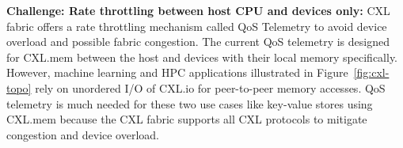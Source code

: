%
%
\noindent \textbf{Challenge: Rate throttling between host CPU and devices only:}
CXL fabric offers a rate throttling mechanism called QoS Telemetry to avoid device overload and possible fabric congestion. 
%
The current QoS telemetry is designed for CXL.mem between the host and devices with their local memory specifically.
%
However, machine learning and HPC applications illustrated in Figure~\ref{fig:cxl-topo} rely on unordered I/O of CXL.io for peer-to-peer memory accesses.
%
QoS telemetry is much needed for these two use cases like key-value stores using CXL.mem because the CXL fabric supports all CXL protocols to mitigate congestion and device overload.
%


%
%


%
%


